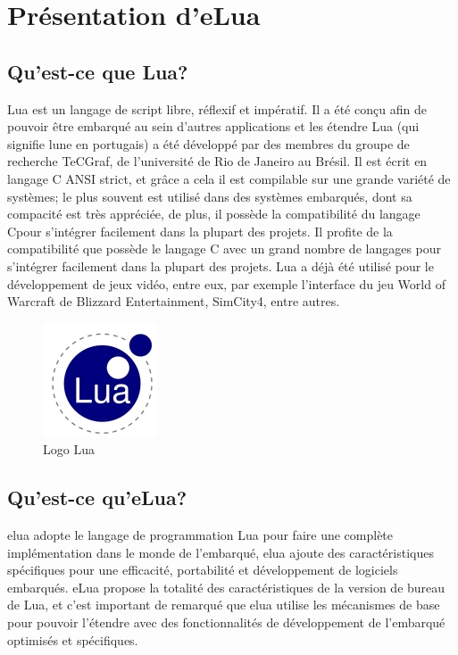 \chapter[Présentation d’eLua]{Présentation d’eLua}
\label{chap:chap3}

\section{Qu'est-ce que Lua?}

Lua est un langage de script libre, réflexif et impératif. Il a été conçu afin de pouvoir être embarqué au sein d'autres applications et les étendre
Lua (qui signifie lune en portugais) a été développé par des membres du groupe de recherche TeCGraf, de l'université de Rio de Janeiro au Brésil.
Il est écrit en langage C ANSI strict, et grâce a cela il est compilable sur une grande variété de systèmes; le plus souvent est utilisé dans des systèmes 
embarqués, dont sa compacité est très appréciée, de plus, il possède la compatibilité du langage Cpour s'intégrer facilement dans la plupart des projets.
Il profite de la compatibilité que possède le langage C avec un grand nombre de langages pour s'intégrer facilement dans la plupart des projets. Lua a déjà
été utilisé pour le développement de jeux vidéo, entre eux, par exemple l'interface du jeu World of Warcraft de Blizzard Entertainment, SimCity4, entre 
autres.

\begin{figure}[h]
\begin{center}
\includegraphics[scale=1]{figure/eLua/Lua.JPG}
\caption{Logo Lua}
\end{center}
\end{figure}


\section{Qu'est-ce qu'eLua?}

  elua adopte le langage de programmation Lua pour faire une complète implémentation dans le monde de l'embarqué, elua ajoute des caractéristiques
spécifiques pour une efficacité, portabilité et développement de logiciels embarqués. eLua propose la totalité des caractéristiques de la version
de bureau de Lua, et c'est important de remarqué que elua utilise les mécanismes de base pour pouvoir l'étendre avec des fonctionnalités de développement 
de l'embarqué optimisés et spécifiques.
 

